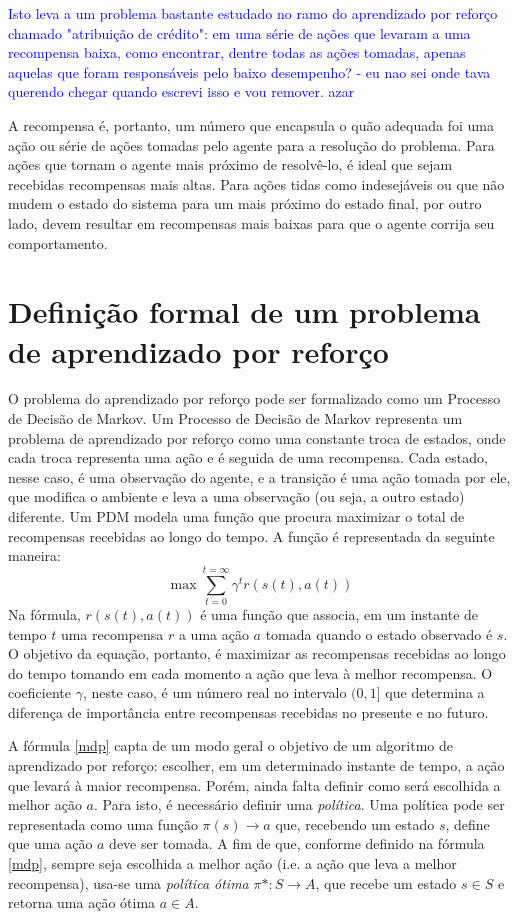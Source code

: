 \documentclass[cic,tc]{iiufrgs}
\newcommand\henrique[1]{\textcolor{blue}{#1}}
\begin{document}
    \henrique{Isto leva a um problema bastante estudado no ramo
    do aprendizado por reforço chamado "atribuição de crédito": em uma série de ações que levaram a uma recompensa baixa, como encontrar, dentre todas as ações tomadas, apenas aquelas que
    foram responsáveis pelo baixo desempenho?  - eu nao sei onde tava querendo chegar quando escrevi isso e vou remover. azar}
    
    A recompensa é, portanto, um número que encapsula o quão adequada foi uma ação ou série de ações tomadas pelo agente para a resolução do problema. Para
    ações que tornam o agente mais próximo de resolvê-lo, é ideal que sejam recebidas recompensas mais altas. Para ações tidas como indesejáveis ou que não
    mudem o estado do sistema para um mais próximo do estado final, por outro lado, devem resultar em recompensas mais baixas para que o agente corrija seu
    comportamento.
    
    \section{Definição formal de um problema de aprendizado por reforço}
    O problema do aprendizado por reforço pode ser formalizado como um Processo de Decisão de Markov. Um Processo de Decisão de Markov representa um problema
    de aprendizado por reforço como uma constante troca de estados, onde cada troca representa uma ação e é seguida de uma recompensa. Cada estado, nesse caso,
    é uma observação do agente, e a transição é uma ação tomada por ele, que modifica o ambiente e leva a uma observação (ou seja, a outro estado) diferente.
    Um PDM modela uma função que procura maximizar o total de recompensas recebidas ao longo do tempo. A função é representada da seguinte maneira:
    \begin{equation}
      \label{mdp}
     \max{\sum_{t=0}^{t=\infty} \gamma^{t}r(s(t),a(t))}
    \end{equation}
     Na fórmula, $r(s(t), a(t))$ é uma função que associa, em um instante de tempo $t$ uma recompensa $r$ a uma ação $a$ tomada quando o estado observado é
     $s$. O objetivo da equação, portanto, é maximizar as recompensas recebidas ao longo do tempo tomando em cada momento a ação que leva à melhor recompensa.
     O coeficiente $\gamma$, neste caso, é um número real no intervalo $(0,1]$ que determina a diferença de importância entre recompensas recebidas no presente
     e no futuro.
    
    A fórmula \ref{mdp} capta de um modo geral o objetivo de um algoritmo de aprendizado por reforço: escolher, em um determinado instante de tempo, a ação que levará
    à maior recompensa. Porém, ainda falta definir como será escolhida a melhor ação $a$. Para isto, é necessário definir uma \textit{política}. Uma política
    pode ser representada como uma função $\pi(s) \rightarrow a$ que, recebendo um estado $s$, define que uma ação $a$ deve ser tomada. A fim de que, conforme
    definido na fórmula \ref{mdp}, sempre seja escolhida a melhor ação (i.e. a ação que leva a melhor recompensa), usa-se uma \textit{política ótima} $\pi*: S \rightarrow A$, que
    recebe um estado $s \in S$ e retorna uma ação ótima $a \in A$.
    
\end{document}
